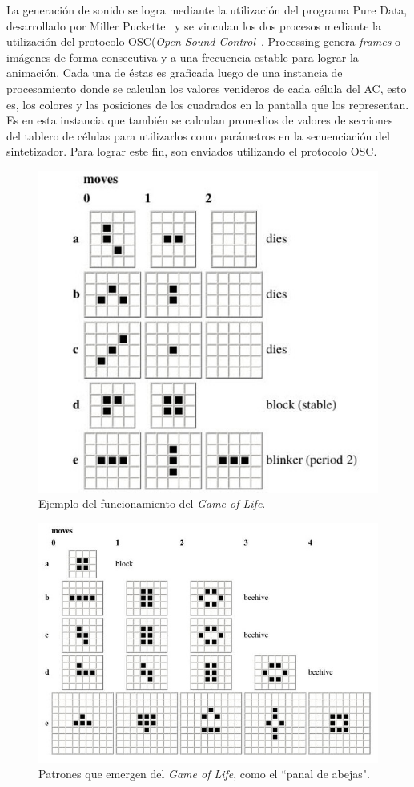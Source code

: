 \documentclass[16pt,spanish]{article}
\begin{document}
	La generación de sonido se logra mediante la utilización del programa Pure
	Data, desarrollado por Miller Puckette~\cite{miller2007theory} y se vinculan
	los dos procesos mediante la utilización del protocolo OSC(\textit{Open Sound
	Control}~\cite{wright2005open}. Processing genera \textit{frames} o imágenes
	de forma consecutiva y a una frecuencia estable para lograr la animación.
	Cada una de éstas es graficada luego de una instancia de procesamiento donde
	se calculan los valores venideros de cada célula del AC, esto es, los colores
	y las posiciones de los cuadrados en la pantalla que los representan. Es en
	esta instancia que también se calculan promedios de valores de secciones del
	tablero de células para utilizarlos como parámetros en la secuenciación del
	sintetizador. Para lograr este fin, son enviados utilizando el protocolo OSC.

\begin{figure}[ht]
	\centering
	\includegraphics[width=0.5\linewidth, bb= 0 0 508 480]{imagesCA/gol_1a.jpg}
	\caption{Ejemplo del funcionamiento del \textit{Game of Life}.~\cite{gardner1971mathematical}}
\end{figure}

\begin{figure}[ht]
\centering
\includegraphics[width=0.5\linewidth, bb = 0 0 681 480]{imagesCA/gol_2a.jpg}
\caption{Patrones que emergen del \textit{Game of Life}, como el ``panal de abejas".~\cite{gardner1971mathematical}}
\end{figure}
	 

\newpage


\end{document}
